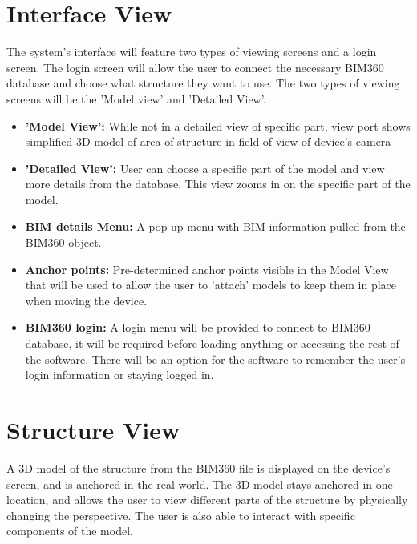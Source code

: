 \documentclass[onecolumn, draftclsnofoot,10pt, compsoc]{IEEEtran}
\begin{document}
\section{Interface View}
The system's interface will feature two types of viewing screens and a login screen. The login screen will allow the user to connect the necessary BIM360 database and choose what structure they want to use. The two types of viewing screens will be the 'Model view' and 'Detailed View'.
\begin{itemize}
    \item \textbf{'Model View':} While not in a detailed view of specific part, view port shows simplified 3D model of area of structure in field of view of device's camera
    \item \textbf{'Detailed View':} User can choose a specific part of the model and view more details from the database.  This view zooms in on the specific part of the model.
    \item \textbf{BIM details Menu:} A pop-up menu with BIM information pulled from the BIM360 object.
    \item \textbf{Anchor points:} Pre-determined anchor points visible in the Model View that will be used to allow the user to 'attach' models to keep them in place when moving the device.
    \item \textbf{BIM360 login:} A login menu will be provided to connect to BIM360 database, it will be required before loading anything or accessing the rest of the software. There will be an option for the software to remember the user's login information or staying logged in.
\end{itemize}
\section{Structure View}
A 3D model of the structure from the BIM360 file is displayed on the device's screen, and is anchored in the real-world. The 3D model stays anchored in one location, and allows the user to view different parts of the structure by physically changing the perspective. The user is also able to interact with specific components of the model.
\end{document}
